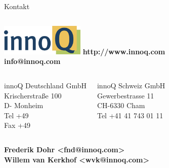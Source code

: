 \documentclass{beamer}
\begin{document}
\begin{frame}{Kontakt}
  \begin{columns}
    \column{5cm}
    \includegraphics[width=4cm]{images/innoQ-Logo-RGB-72dpi.png}
    \vspace{4mm}
    \column{4.5cm}
    \textbf{http://www.innoq.com \\info@innoq.com}
  \end{columns}

  \begin{columns}
    \column{5cm}
      innoQ Deutschland GmbH\\
      Krischerstraße 100\\
      D- Monheim\\
      Tel     +49 \\
      Fax     +49

    \column{5cm}
      innoQ Schweiz GmbH \\
      Gewerbestrasse 11 \\
      CH-6330 Cham \\
      Tel     +41 41 743 01 11
    \end{columns}
  \vspace{10mm}

  \textbf{
    Frederik Dohr      <fnd@innoq.com> \\
    Willem van Kerkhof <wvk@innoq.com>
  }
\end{frame}
\end{document}
